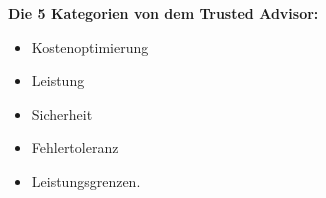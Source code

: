   \textbf{Die 5 Kategorien von dem Trusted Advisor:}
  
  \begin{itemize}
    \item
    Kostenoptimierung

    \item
    Leistung
    \item
    Sicherheit 
    \item
    Fehlertoleranz
    \item
    Leistungsgrenzen.
  \end{itemize}\textbf{}




